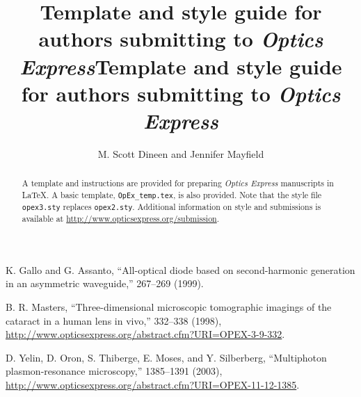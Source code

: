 \documentclass[10pt,letterpaper]{article}
\begin{document}
\title{Template and style guide for authors submitting to \textit{Optics Express}}

\vskip4pc

\tableofcontents
\clearpage

\title{Template and style guide for authors submitting to \textit{Optics Express}}

\author{M. Scott Dineen and Jennifer Mayfield}

\address{Optics Express Office, Publications Department, Optical Society of America, \\ Washington, D.C., 20036}




\begin{abstract} A template and instructions are provided for preparing \textit{Optics Express} manuscripts in \LaTeX. A basic template, \texttt{OpEx\_temp.tex}, is also provided. Note that the style file \texttt{opex3.sty} replaces \texttt{opex2.sty}. Additional information on style and submissions is available at \mbox{\url{http://www.opticsexpress.org/submission}}.\end{abstract}


\begin{thebibliography}{99}
 K. Gallo and G. Assanto, ``All-optical diode based on second-harmonic generation in an asymmetric waveguide,''  267--269 (1999).
 
 B. R. Masters, ``Three-dimensional microscopic tomographic imagings of the cataract in a human lens in vivo,''  332--338 (1998), \url{http://www.opticsexpress.org/abstract.cfm?URI=OPEX-3-9-332}.
 
 D. Yelin,  D. Oron,  S. Thiberge,  E. Moses, and Y. Silberberg, ``Multiphoton plasmon-resonance microscopy,''  1385--1391 (2003), \url{http://www.opticsexpress.org/abstract.cfm?URI=OPEX-11-12-1385}.
\end{thebibliography}
\end{document}
